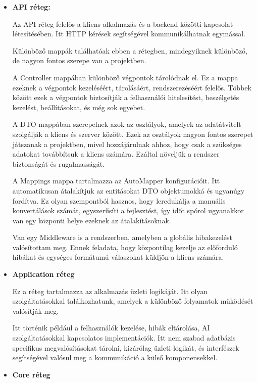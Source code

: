 \begin{itemize}
    \item \textbf{API réteg:}
    
    Az API réteg felelős a kliens alkalmazás és a backend közötti kapcsolat létesítésében. Itt HTTP kérések segítségével kommunikálhatnak egymással.

    Különböző mappák találhatóak ebben a rétegben, mindegyiknek különböző, de nagyon fontos szerepe van a projektben.

    A Controller mappában különböző végpontok tárolódnak el. Ez a mappa ezeknek a végpontok kezeléséért, tárolásáért, rendszerezéséért felelős. Többek között ezek a végpontok biztosítják a felhasználói hitelesítést, beszélgetés kezelést, beállításokat, és még sok egyebet.

    A DTO mappában szerepelnek azok az osztályok, amelyek az adatátvitelt szolgálják a kliens és szerver között. Ezek az osztályok nagyon fontos szerepet játszanak a projektben, mivel hozzájárulnak ahhoz, hogy csak a szükséges adatokat továbbítsuk a kliens számára. Ezáltal növeljük a rendszer biztonságát és rugalmasságát.

    A Mappings mappa tartalmazza az AutoMapper  \cite{automapper} konfigurációit. Itt automatikusan átalakítjuk az entitásokat DTO objektumokká és ugyanúgy fordítva. Ez olyan szempontból hasznos, hogy leredukálja a manuális konvertálások számát, egyszerűsíti a fejlesztést, így időt spórol ugyanakkor van egy központi helye ezeknek az átalakításoknak.

    Van egy Middleware \cite{aspnetcoreMiddleware} is a rendszerben, amelyben a globális hibakezelést valósítottam meg. Ennek feladata, hogy központilag kezelje az előforduló hibákat és egységes formátumú válaszokat küldjön a kliens számára.

    \item \textbf{Application réteg}

    Ez a réteg tartalmazza az alkalmazás üzleti logikáját. Itt olyan szolgáltatásokkal találkozhatunk, amelyek a különböző folyamatok működését valósítják meg.

    Itt történik például a felhasználók kezelése, hibák eltárolása, AI szolgáltatásokkal kapcsolatos implementációk. Itt nem szabad adatbázis specifikus megvalósításokat tárolni, kizárólag üzleti logikát, és interfészek segítségével valósul meg a kommunikáció a külső komponensekkel.

    \item \textbf{Core réteg}


\end{itemize}
